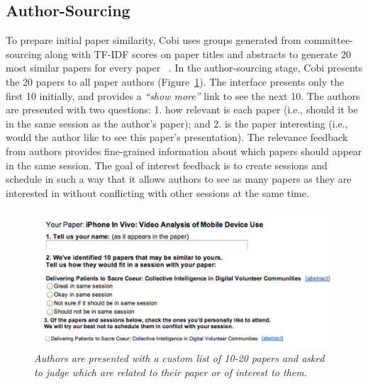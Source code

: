 \documentclass[letterpaper]{article}
\begin{document}
\subsection{Author-Sourcing}
To prepare initial paper similarity, Cobi uses groups generated from committee-sourcing along with TF-IDF scores on paper titles and abstracts to generate 20 most similar papers for every paper ~\cite{CommunityClusteringHCOMP13}. In the author-sourcing stage, Cobi presents the 20 papers to all paper authors (Figure~\ref{author-sourcing}). The interface presents only the first 10 initially, and provides a \emph{``show more''} link to see the next 10.  The authors are presented with two questions: 1. how relevant is each paper (i.e., should it be in the same session as the author's paper); and 2. is the paper interesting (i.e., would the author like to see this paper's presentation). The relevance feedback from authors provides fine-grained information about which papers should appear in the same session. The goal of interest feedback is to create sessions and schedule in such a way that it allows authors to see as many papers as they are interested in without conflicting with other sessions at the same time.
\begin{figure}[!h]
\centering
\includegraphics[width=0.9\columnwidth]{author-sourcing.png}
\caption{\emph{Authors are presented with a custom list of 10-20 papers and asked to judge which are related to their paper or of interest to them.}}
\label{author-sourcing}
\end{figure}
\end{document}
